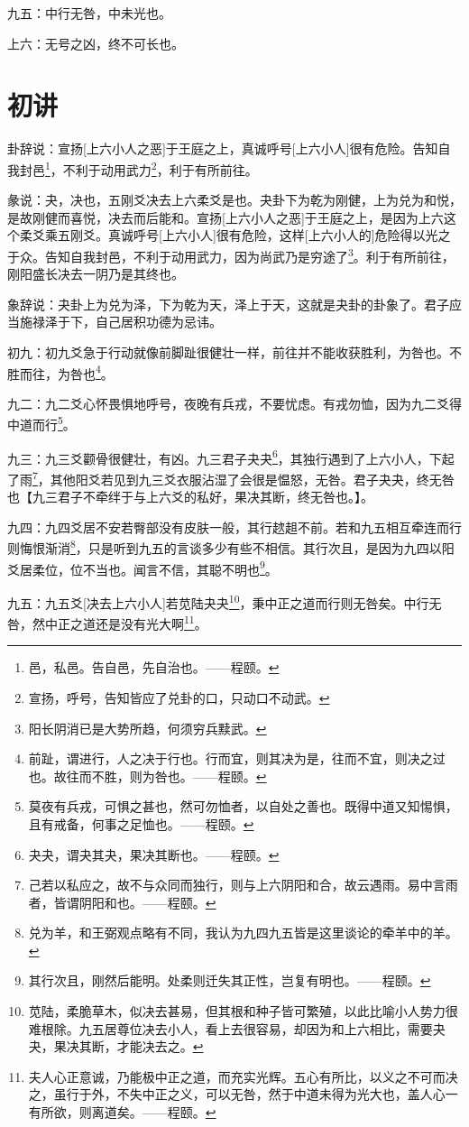 \documentclass[12pt,oneside]{book}
\begin{document}
九五：中行无咎，中未光也。

上六：无号之凶，终不可长也。

\section{初讲}
卦辞说：宣扬[上六小人之恶]于王庭之上，真诚呼号[上六小人]很有危险。告知自我封邑\footnote{邑，私邑。告自邑，先自治也。——程颐。}，不利于动用武力\footnote{宣扬，呼号，告知皆应了兑卦的口，只动口不动武。}，利于有所前往。

彖说：夬，决也，五刚爻决去上六柔爻是也。夬卦下为乾为刚健，上为兑为和悦，是故刚健而喜悦，决去而后能和。宣扬[上六小人之恶]于王庭之上，是因为上六这个柔爻乘五刚爻。真诚呼号[上六小人]很有危险，这样[上六小人的]危险得以光之于众。告知自我封邑，不利于动用武力，因为尚武乃是穷途了\footnote{阳长阴消已是大势所趋，何须穷兵黩武。}。利于有所前往，刚阳盛长决去一阴乃是其终也。

象辞说：夬卦上为兑为泽，下为乾为天，泽上于天，这就是夬卦的卦象了。君子应当施禄泽于下，自己居积功德为忌讳。

初九：初九爻急于行动就像前脚趾很健壮一样，前往并不能收获胜利，为咎也。不胜而往，为咎也\footnote{前趾，谓进行，人之决于行也。行而宜，则其决为是，往而不宜，则决之过也。故往而不胜，则为咎也。——程颐。}。

九二：九二爻心怀畏惧地呼号，夜晚有兵戎，不要忧虑。有戎勿恤，因为九二爻得中道而行\footnote{莫夜有兵戎，可惧之甚也，然可勿恤者，以自处之善也。既得中道又知惕惧，且有戒备，何事之足恤也。——程颐。}。

九三：九三爻颧骨很健壮，有凶。九三君子夬夬\footnote{夬夬，谓夬其夬，果决其断也。——程颐。}，其独行遇到了上六小人，下起了雨\footnote{己若以私应之，故不与众同而独行，则与上六阴阳和合，故云遇雨。易中言雨者，皆谓阴阳和也。——程颐。}，其他阳爻若见到九三爻衣服沾湿了会很是愠怒，无咎。君子夬夬，终无咎也【九三君子不牵绊于与上六爻的私好，果决其断，终无咎也。】。

九四：九四爻居不安若臀部没有皮肤一般，其行趑趄不前。若和九五相互牵连而行则悔恨渐消\footnote{兑为羊，和王弼观点略有不同，我认为九四九五皆是这里谈论的牵羊中的羊。}，只是听到九五的言谈多少有些不相信。其行次且，是因为九四以阳爻居柔位，位不当也。闻言不信，其聪不明也\footnote{其行次且，刚然后能明。处柔则迁失其正性，岂复有明也。——程颐。}。

九五：九五爻[决去上六小人]若苋陆夬夬\footnote{苋陆，柔脆草木，似决去甚易，但其根和种子皆可繁殖，以此比喻小人势力很难根除。九五居尊位决去小人，看上去很容易，却因为和上六相比，需要夬夬，果决其断，才能决去之。}，秉中正之道而行则无咎矣。中行无咎，然中正之道还是没有光大啊\footnote{夫人心正意诚，乃能极中正之道，而充实光辉。五心有所比，以义之不可而决之，虽行于外，不失中正之义，可以无咎，然于中道未得为光大也，盖人心一有所欲，则离道矣。——程颐。}。
\end{document}
